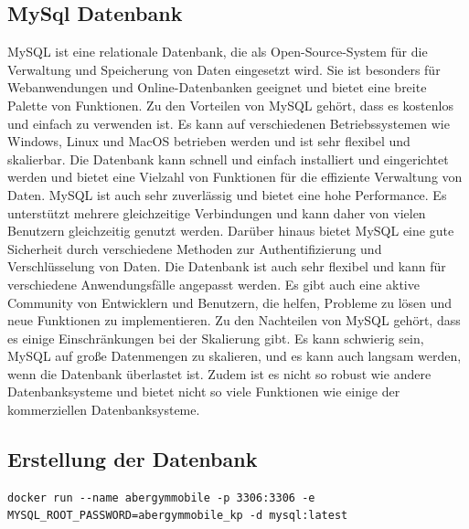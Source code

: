 \newpage
\subsection{MySql Datenbank}

MySQL \cite{MySQL} ist eine relationale Datenbank, die als Open-Source-System für die Verwaltung und Speicherung von Daten eingesetzt wird. Sie ist besonders für Webanwendungen und Online-Datenbanken geeignet und bietet eine breite Palette von Funktionen.
\newline
\newline
Zu den Vorteilen von MySQL gehört, dass es kostenlos und einfach zu verwenden ist. Es kann auf verschiedenen Betriebssystemen wie Windows, Linux und MacOS betrieben werden und ist sehr flexibel und skalierbar. Die Datenbank kann schnell und einfach installiert und eingerichtet werden und bietet eine Vielzahl von Funktionen für die effiziente Verwaltung von Daten. MySQL ist auch sehr zuverlässig und bietet eine hohe Performance. Es unterstützt mehrere gleichzeitige Verbindungen und kann daher von vielen Benutzern gleichzeitig genutzt werden.
\newline
\newline
Darüber hinaus bietet MySQL eine gute Sicherheit durch verschiedene Methoden zur Authentifizierung und Verschlüsselung von Daten. Die Datenbank ist auch sehr flexibel und kann für verschiedene Anwendungsfälle angepasst werden. Es gibt auch eine aktive Community von Entwicklern und Benutzern, die helfen, Probleme zu lösen und neue Funktionen zu implementieren.
\newline
\newline
Zu den Nachteilen von MySQL gehört, dass es einige Einschränkungen bei der Skalierung gibt. Es kann schwierig sein, MySQL auf große Datenmengen zu skalieren, und es kann auch langsam werden, wenn die Datenbank überlastet ist. Zudem ist es nicht so robust wie andere Datenbanksysteme und bietet nicht so viele Funktionen wie einige der kommerziellen Datenbanksysteme.
\newpage

\subsection{Erstellung der Datenbank}

\begin{lstlisting}[caption=Erstellung der Datenbank mittels Docker Befehl,label=lst:impl:foo]
    docker run --name abergymmobile -p 3306:3306 -e MYSQL_ROOT_PASSWORD=abergymmobile_kp -d mysql:latest
\end{lstlisting}

